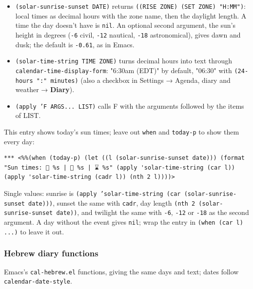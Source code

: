 \documentclass[11pt]{article}
\begin{document}
\begin{itemize}
\item \texttt{(solar-sunrise-sunset DATE)} returns \texttt{((RISE ZONE) (SET ZONE) "H:MM")}: local times as decimal hours with the zone name, then the daylight length. A time the day doesn't have is \texttt{nil}. An optional second argument, the sun's height in degrees (\texttt{-6} civil, \texttt{-12} nautical, \texttt{-18} astronomical), gives dawn and dusk; the default is \texttt{-0.61}, as in Emacs.
\item \texttt{(solar-time-string TIME ZONE)} turns decimal hours into text through \texttt{calendar-time-display-form}: "6:30am (EDT)" by default, "06:30" with \texttt{(24-hours ":" minutes)} (also a checkbox in Settings → Agenda, diary and weather → \textbf{Diary}).
\item \texttt{(apply 'F ARGS... LIST)} calls F with the arguments followed by the items of LIST.
\end{itemize}

This entry shows today's sun times; leave out \texttt{when} and \texttt{today-p} to show them every day:

\begin{verbatim}
*** <%%(when (today-p) (let ((l (solar-sunrise-sunset date))) (format "Sun times: 🌅 %s | 🌇 %s | ⌛ %s" (apply 'solar-time-string (car l)) (apply 'solar-time-string (cadr l)) (nth 2 l))))>
\end{verbatim}

Single values: sunrise is \texttt{(apply 'solar-time-string (car (solar-sunrise-sunset date)))}, sunset the same with \texttt{cadr}, day length \texttt{(nth 2 (solar-sunrise-sunset date))}, and twilight the same with \texttt{-6}, \texttt{-12} or \texttt{-18} as the second argument. A day without the event gives \texttt{nil}; wrap the entry in \texttt{(when (car l) ...)} to leave it out.

\subsubsection{Hebrew diary functions}
\label{sec:org5058e69}
Emacs's \texttt{cal-hebrew.el} functions, giving the same days and text; dates follow \texttt{calendar-date-style}.
\end{document}
